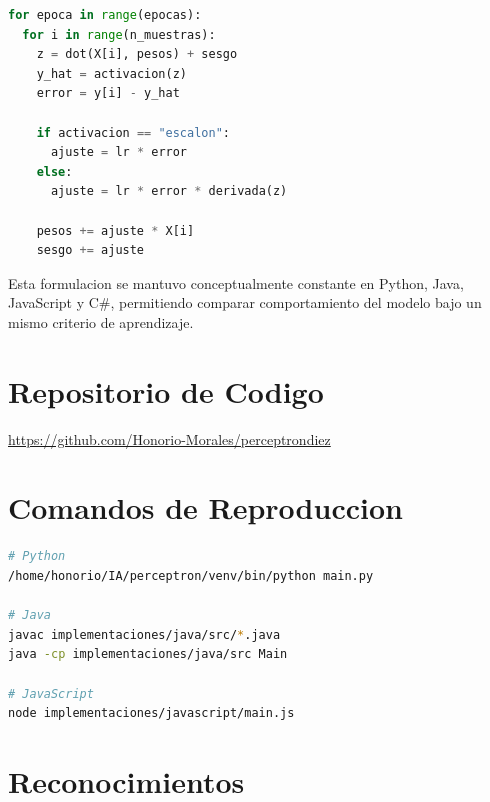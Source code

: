 \documentclass[10pt,twocolumn,a4paper]{article}
\begin{document}
\begin{lstlisting}[language=Python,caption={Pseudocodigo del entrenamiento del perceptron}]
for epoca in range(epocas):
  for i in range(n_muestras):
    z = dot(X[i], pesos) + sesgo
    y_hat = activacion(z)
    error = y[i] - y_hat

    if activacion == "escalon":
      ajuste = lr * error
    else:
      ajuste = lr * error * derivada(z)

    pesos += ajuste * X[i]
    sesgo += ajuste
\end{lstlisting}

Esta formulacion se mantuvo conceptualmente constante en Python, Java,
JavaScript y C\#, permitiendo comparar comportamiento del modelo bajo
un mismo criterio de aprendizaje.

\section*{Repositorio de Codigo}

\begin{center}
\small\url{https://github.com/Honorio-Morales/perceptrondiez}
\end{center}

\section*{Comandos de Reproduccion}

\begin{lstlisting}[language=bash, numbers=none, frame=single,
  basicstyle=\ttfamily\fontsize{8}{9}\selectfont]
# Python
/home/honorio/IA/perceptron/venv/bin/python main.py

# Java
javac implementaciones/java/src/*.java
java -cp implementaciones/java/src Main

# JavaScript
node implementaciones/javascript/main.js
\end{lstlisting}

\section*{Reconocimientos}
\end{document}

